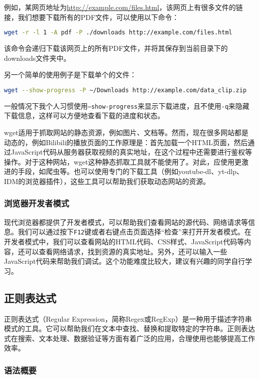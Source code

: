例如，某网页地址为\url{http://example.com/files.html}，该网页上有很多文件的链接，我们想要下载所有的PDF文件，可以使用以下命令：
\begin{lstlisting}[language=bash]
  wget -r -l 1 -A pdf -P ./downloads http://example.com/files.html
\end{lstlisting}
该命令会递归下载该网页上的所有PDF文件，并将其保存到当前目录下的downloads文件夹中。

另一个简单的使用例子是下载单个的文件：
\begin{lstlisting}[language=bash]
  wget --show-progress -P ~/Downloads http://example.com/data_clip.zip
\end{lstlisting}
一般情况下我个人习惯使用\texttt{--show-progress}来显示下载进度，且不使用\texttt{-q}来隐藏下载信息，这样可以方便地查看下载的进度和状态。

wget适用于抓取网站的静态资源，例如图片、文档等。然而，现在很多网站都是动态的，例如Bilibili的播放页面的工作原理是：首先加载一个HTML页面，然后通过JavaScript代码从服务器获取视频的真实地址，在这个过程中还需要进行鉴权等操作。对于这种网站，wget这种静态抓取工具就不能使用了。对此，应使用更激进的手段，如爬虫等。也可以使用专门的下载工具（例如youtube-dl、yt-dlp、IDM的浏览器插件），这些工具可以帮助我们获取动态网站的资源。

\subsubsection{浏览器开发者模式}

现代浏览器都提供了开发者模式，可以帮助我们查看网站的源代码、网络请求等信息。我们可以通过按下\texttt{F12}键或者右键点击页面选择“检查”来打开开发者模式。在开发者模式中，我们可以查看网站的HTML代码、CSS样式、JavaScript代码等内容，还可以查看网络请求，找到资源的真实地址。另外，还可以输入一些JavaScript代码来帮助我们调试。这个功能难度比较大，建议有兴趣的同学自行学习。

\subsection{正则表达式}\label{sec:regex}

正则表达式（Regular Expression，简称Regex或RegExp）是一种用于描述字符串模式的工具。它可以帮助我们在文本中查找、替换和提取特定的字符串。正则表达式在搜索、文本处理、数据验证等方面有着广泛的应用，合理使用也能够提高工作效率。

\subsubsection{语法概要}


